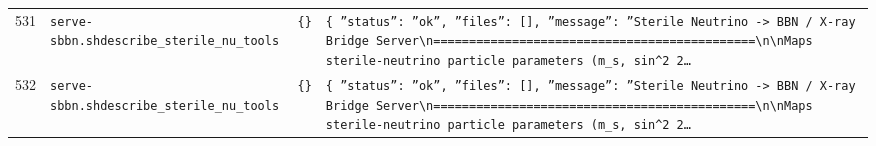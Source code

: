 \documentclass[11pt,a4paper]{article}
\begin{document}
\begin{longtable}{@{}p{}p{}p{}p{}@{}}
531 & \texttt{serve-sbbn.sh}\newline\texttt{describe\_\allowbreak{}sterile\_\allowbreak{}nu\_\allowbreak{}tools} & \texttt{\{\}\allowbreak{}} & \texttt{\{   ''status'':\allowbreak{} ''ok'',\allowbreak{}   ''files'':\allowbreak{} []\allowbreak{},\allowbreak{}   ''message'':\allowbreak{} ''Sterile Neutrino -\textgreater{}\allowbreak{} BBN /\allowbreak{} X-ray Bridge Server\textbackslash{}\allowbreak{}n=\allowbreak{}=\allowbreak{}=\allowbreak{}=\allowbreak{}=\allowbreak{}=\allowbreak{}=\allowbreak{}=\allowbreak{}=\allowbreak{}=\allowbreak{}=\allowbreak{}=\allowbreak{}=\allowbreak{}=\allowbreak{}=\allowbreak{}=\allowbreak{}=\allowbreak{}=\allowbreak{}=\allowbreak{}=\allowbreak{}=\allowbreak{}=\allowbreak{}=\allowbreak{}=\allowbreak{}=\allowbreak{}=\allowbreak{}=\allowbreak{}=\allowbreak{}=\allowbreak{}=\allowbreak{}=\allowbreak{}=\allowbreak{}=\allowbreak{}=\allowbreak{}=\allowbreak{}=\allowbreak{}=\allowbreak{}=\allowbreak{}=\allowbreak{}=\allowbreak{}=\allowbreak{}=\allowbreak{}=\allowbreak{}=\allowbreak{}=\allowbreak{}\textbackslash{}\allowbreak{}n\textbackslash{}\allowbreak{}nMaps sterile-neutrino particle parameters (m\_\allowbreak{}s,\allowbreak{} sin\textasciicircum{}\allowbreak{}2 2\ldots{}\allowbreak{}} \\
532 & \texttt{serve-sbbn.sh}\newline\texttt{describe\_\allowbreak{}sterile\_\allowbreak{}nu\_\allowbreak{}tools} & \texttt{\{\}\allowbreak{}} & \texttt{\{   ''status'':\allowbreak{} ''ok'',\allowbreak{}   ''files'':\allowbreak{} []\allowbreak{},\allowbreak{}   ''message'':\allowbreak{} ''Sterile Neutrino -\textgreater{}\allowbreak{} BBN /\allowbreak{} X-ray Bridge Server\textbackslash{}\allowbreak{}n=\allowbreak{}=\allowbreak{}=\allowbreak{}=\allowbreak{}=\allowbreak{}=\allowbreak{}=\allowbreak{}=\allowbreak{}=\allowbreak{}=\allowbreak{}=\allowbreak{}=\allowbreak{}=\allowbreak{}=\allowbreak{}=\allowbreak{}=\allowbreak{}=\allowbreak{}=\allowbreak{}=\allowbreak{}=\allowbreak{}=\allowbreak{}=\allowbreak{}=\allowbreak{}=\allowbreak{}=\allowbreak{}=\allowbreak{}=\allowbreak{}=\allowbreak{}=\allowbreak{}=\allowbreak{}=\allowbreak{}=\allowbreak{}=\allowbreak{}=\allowbreak{}=\allowbreak{}=\allowbreak{}=\allowbreak{}=\allowbreak{}=\allowbreak{}=\allowbreak{}=\allowbreak{}=\allowbreak{}=\allowbreak{}=\allowbreak{}=\allowbreak{}\textbackslash{}\allowbreak{}n\textbackslash{}\allowbreak{}nMaps sterile-neutrino particle parameters (m\_\allowbreak{}s,\allowbreak{} sin\textasciicircum{}\allowbreak{}2 2\ldots{}\allowbreak{}} \\

\end{longtable}
\end{document}
